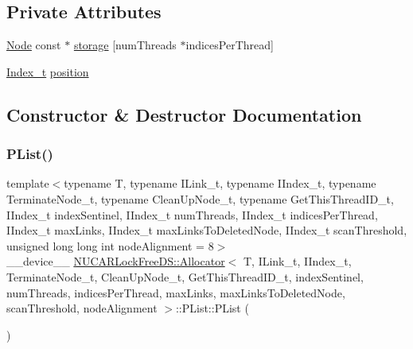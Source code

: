 \subsection*{Private Attributes}
\begin{DoxyCompactItemize}
\item 
\mbox{\hyperlink{class_n_u_c_a_r_lock_free_d_s_1_1_allocator_1_1_node}{Node}} const  $\ast$ \mbox{\hyperlink{class_n_u_c_a_r_lock_free_d_s_1_1_allocator_1_1_p_list_ac90fa5d4c7048415d16c8b46e5b3290a}{storage}} \mbox{[}num\+Threads $\ast$indices\+Per\+Thread\mbox{]}
\item 
\mbox{\hyperlink{class_n_u_c_a_r_lock_free_d_s_1_1_allocator_a2776cca35e8343bf5007bd8b6f3a3f8f}{Index\+\_\+t}} \mbox{\hyperlink{class_n_u_c_a_r_lock_free_d_s_1_1_allocator_1_1_p_list_a36446eb7ee5bc5173b9877e3baa9a3a4}{position}}
\end{DoxyCompactItemize}


\subsection{Constructor \& Destructor Documentation}
\mbox{\label{class_n_u_c_a_r_lock_free_d_s_1_1_allocator_1_1_p_list_afd02db15ba9865760bb8c0649c1897a7}} 
\subsubsection{\texorpdfstring{P\+List()}{PList()}}
{\footnotesize\ttfamily template$<$typename T, typename I\+Link\+\_\+t, typename I\+Index\+\_\+t, typename Terminate\+Node\+\_\+t, typename Clean\+Up\+Node\+\_\+t, typename Get\+This\+Thread\+I\+D\+\_\+t, I\+Index\+\_\+t index\+Sentinel, I\+Index\+\_\+t num\+Threads, I\+Index\+\_\+t indices\+Per\+Thread, I\+Index\+\_\+t max\+Links, I\+Index\+\_\+t max\+Links\+To\+Deleted\+Node, I\+Index\+\_\+t scan\+Threshold, unsigned long long int node\+Alignment = 8$>$ \\
\+\_\+\+\_\+device\+\_\+\+\_\+ \mbox{\hyperlink{class_n_u_c_a_r_lock_free_d_s_1_1_allocator}{N\+U\+C\+A\+R\+Lock\+Free\+D\+S\+::\+Allocator}}$<$ T, I\+Link\+\_\+t, I\+Index\+\_\+t, Terminate\+Node\+\_\+t, Clean\+Up\+Node\+\_\+t, Get\+This\+Thread\+I\+D\+\_\+t, index\+Sentinel, num\+Threads, indices\+Per\+Thread, max\+Links, max\+Links\+To\+Deleted\+Node, scan\+Threshold, node\+Alignment $>$\+::P\+List\+::\+P\+List (\begin{DoxyParamCaption}{ }\end{DoxyParamCaption})\hspace{0.3cm}{\ttfamily [inline]}}



